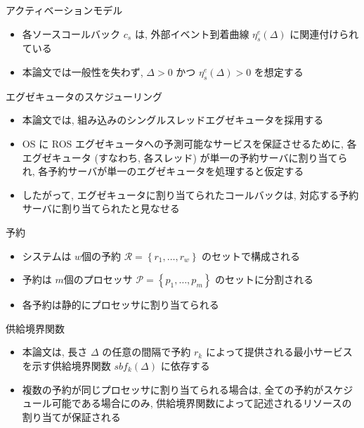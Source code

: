 \begin{frame}{アクティベーションモデル}
    \begin{itemize}
        \item 各ソースコールバック $c_{s}$ は, 外部イベント到着曲線 $\eta_{s}^{e}(\Delta)$ \cite{henia2005system, leboudec2001theory, thiele2000real}に関連付けられている
        \item 本論文では一般性を失わず, $\Delta>0$ かつ $\eta_{s}^{e}(\Delta)>0$ を想定する
    \end{itemize}
\end{frame}

\begin{frame}{エグゼキュータのスケジューリング}
    \begin{itemize}
        \item 本論文では, 組み込みのシングルスレッドエグゼキュータを採用する
        \item OS に ROS エグゼキュータへの予測可能なサービスを保証させるために, 各エグゼキュータ (すなわち, 各スレッド) が単一の予約サーバに割り当てられ, 各予約サーバが単一のエグゼキュータを処理すると仮定する
        \item したがって, エグゼキュータに割り当てられたコールバックは, 対応する予約サーバに割り当てられたと見なせる
    \end{itemize}
\end{frame}

\begin{frame}{予約}
    \begin{itemize}
        \item システムは $w$個の予約 $\mathcal{R}=\left\{r_{1}, \ldots, r_{w}\right\}$ のセットで構成される
        \item 予約は $m$個のプロセッサ $\mathcal{P}=\left\{p_{1}, \ldots, p_{m}\right\}$ のセットに分割される
        \item 各予約は静的にプロセッサに割り当てられる
    \end{itemize}
\end{frame}

\begin{frame}{供給境界関数}
    \begin{itemize}
        \item 本論文は, 長さ $\Delta$ の任意の間隔で予約 $r_{k}$ によって提供される最小サービスを示す供給境界関数 $sbf_{k}(\Delta)$ \cite{lipari2003resource, shin2003periodic} に依存する
        \item 複数の予約が同じプロセッサに割り当てられる場合は, 全ての予約がスケジュール可能である場合にのみ, 供給境界関数によって記述されるリソースの割り当てが保証される
    \end{itemize}
\end{frame}

